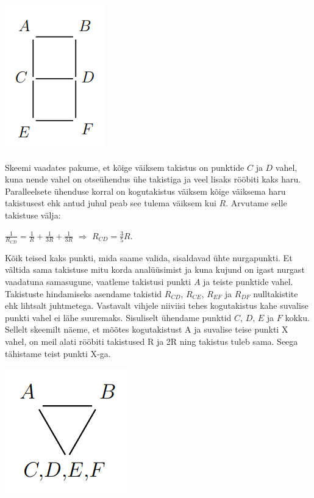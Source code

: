 \documentclass[11pt]{article}
\begin{document}
{{\ifSolution
\begin{center}
	\includegraphics[width=0.5\linewidth]{2016-v3p-09-lah1.png}
\end{center}
Skeemi vaadates pakume, et kõige väiksem takistus on punktide $C$ ja $D$ vahel, kuna nende vahel on otseühendus ühe takistiga ja veel lisaks rööbiti kaks haru. Paralleelsete ühenduse korral on kogutakistus väiksem kõige väiksema haru takistusest ehk antud juhul peab see tulema väiksem kui $R$. Arvutame selle takistuse välja:
\begin{center}
$\frac{1}{R_{CD}} = \frac{1}{R} + \frac{1}{3R}+\frac{1}{3R}$ $\Rightarrow$  $R_{CD} = \frac{3}{5}R$.
\end{center}
Kõik teised kaks punkti, mida saame valida, sisaldavad ühte nurgapunkti. Et vältida sama takistuse mitu korda analüüsimist ja kuna kujund on igast nurgast vaadatuna samasugune, vaatleme takistusi punkti $A$ ja teiste punktide vahel. 
Takistuste hindamiseks asendame takistid $R_{CD}$, $R_{CE}$, $R_{EF}$ ja $R_{DF}$ nulltakistite ehk lihtsalt juhtmetega. Vastavalt vihjele niiviisi tehes kogutakistus kahe suvalise punkti vahel ei lähe suuremaks. Sisuliselt ühendame punktid $C$, $D$, $E$ ja $F$ kokku. Sellelt skeemilt näeme, et mõõtes kogutakistust A ja suvalise teise punkti X vahel, on meil alati rööbiti takistused R ja 2R ning takistus tuleb sama. Seega tähistame teist punkti X-ga. 
\begin{center}
	\includegraphics[width=0.5\linewidth]{2016-v3p-09-lah2.png}

\end{center}}}
\end{document}
